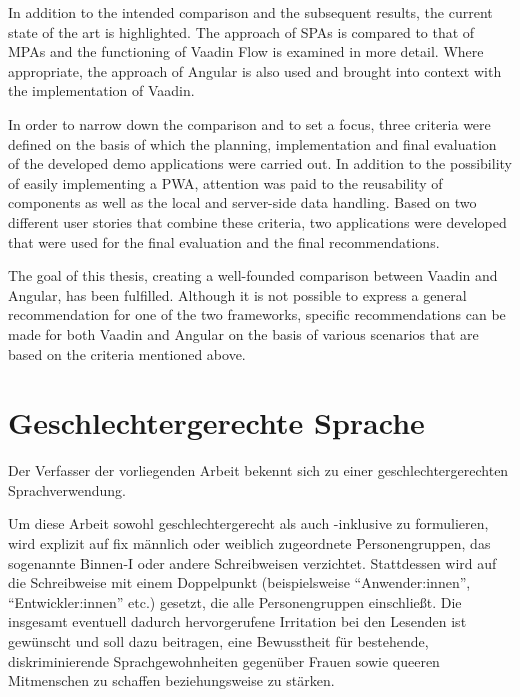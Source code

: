 \documentclass[a4paper,12pt,twoside]{scrreprt}
\begin{document}
\medskip

In addition to the intended comparison and the subsequent results, the current state of the art is highlighted. The approach of \acsp{SPA} is compared to that of \acsp{MPA} and the functioning of Vaadin Flow is examined in more detail. Where appropriate, the approach of Angular is also used and brought into context with the implementation of Vaadin.

\medskip

In order to narrow down the comparison and to set a focus, three criteria were defined on the basis of which the planning, implementation and final evaluation of the developed demo applications were carried out. In addition to the possibility of easily implementing a \acs{PWA}, attention was paid to the reusability of components as well as the local and server-side data handling. Based on two different user stories that combine these criteria, two applications were developed that were used for the final evaluation and the final recommendations.

\medskip

The goal of this thesis, creating a well-founded comparison between Vaadin and Angular, has been fulfilled. Although it is not possible to express a general recommendation for one of the two frameworks, specific recommendations can be made for both Vaadin and Angular on the basis of various scenarios that are based on the criteria mentioned above.

\newpage
\section*{Geschlechtergerechte Sprache}
\label{sec:gendern}

Der Verfasser der vorliegenden Arbeit bekennt sich zu einer geschlechtergerechten Sprachverwendung.

Um diese Arbeit sowohl geschlechtergerecht als auch -inklusive zu formulieren, wird explizit auf fix männlich oder weiblich zugeordnete Personengruppen, das sogenannte Binnen-I oder andere Schreibweisen verzichtet. Stattdessen wird auf die Schreibweise mit einem Doppelpunkt (beispielsweise \enquote{Anwender:innen}, \enquote{Entwickler:innen} etc.) gesetzt, die alle Personengruppen einschließt. Die insgesamt eventuell dadurch hervorgerufene
Irritation bei den Lesenden ist gewünscht und soll dazu beitragen, eine Bewusstheit für bestehende, diskriminierende Sprachgewohnheiten gegenüber Frauen sowie queeren Mitmenschen zu schaffen beziehungsweise zu stärken.
\end{document}
